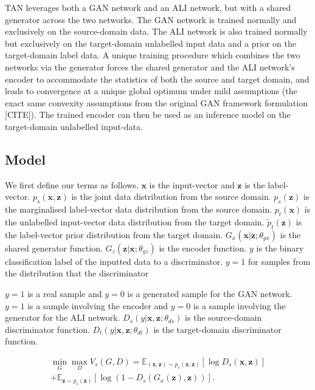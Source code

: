 \documentclass{article}
\begin{document}
TAN leverages both a GAN network and an ALI network, but with a shared generator across the two networks. The GAN network is trained normally and exclusively on the source-domain data. The ALI network is also trained normally but exclusively on the target-domain unlabelled input data and a prior on the target-domain label data. A unique training procedure which combines the two networks via the generator forces the shared generator and the ALI network's encoder to accommodate the statistics of both the source and target domain, and leads to convergence at a unique global optimum under mild assumptions (the exact same convexity assumptions from the original GAN framework formulation [CITE]). The trained encoder can then be used as an inference model on the target-domain unlabelled input-data.
\subsection{Model}
We first define our terms as follows. $\bm{x}$ is the input-vector and $\bm{z}$ is the label-vector. $p_s(\bm{x},\bm{z})$ is the joint data distribution from the source domain. $p_s(\bm{z})$ is the marginalised label-vector data distribution from the source domain. $p_t(\bm{x})$ is the unlabelled input-vector data distribution from the target domain. $\widetilde{p}_t(\bm{z})$ is the label-vector prior distribution from the target domain. $G_x(\bm{x}|\bm{z}; \theta_{gx})$ is the shared generator function. $G_z(\bm{z}|\bm{x}; \theta_{gz})$ is the encoder function. $y$ is the binary classification label of the inputted data to a discriminator. $y=1$ for samples from the distribution that the discriminator 


$y=1$ is a real sample and $y=0$ is a generated sample for the GAN network. $y=1$ is a sample involving the encoder and $y=0$ is a sample involving the generator for the ALI network. $D_s(y|\bm{x},\bm{z}; \theta_{ds})$ is the source-domain discriminator function. $D_t(y|\bm{x},\bm{z}; \theta_{dt})$ is the target-domain discriminator function.

\begin{equation}
\begin{split}
\min_{G} \max_{D} V_s(G, D) = \mathbb{E}_{(\bm{x},\bm{z})\sim p_s(\bm{x},\bm{z})}[\log D_s(\bm{x}, \bm{z})]\\
+ \mathbb{E}_{\bm{z}\sim p_{s}(\bm{z})}[\log (1 - D_s(G_x(\bm{z}), \bm{z}) )].
\end{split}
\end{equation}
\end{document}
